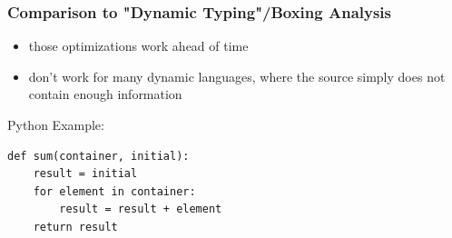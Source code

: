 \documentclass[utf8x]{beamer}
\begin{document}
\begin{frame}[containsverbatim]
  \frametitle{Comparison to "Dynamic Typing"/Boxing Analysis}
  \begin{itemize}
      \item those optimizations work ahead of time
      \item don't work for many dynamic languages, where the source simply does not contain enough information
  \end{itemize}
  \begin{block}{Python Example:}
  \begin{verbatim}
def sum(container, initial):
    result = initial
    for element in container:
        result = result + element
    return result
  \end{verbatim}
  \end{block}
\end{frame}
\end{document}
